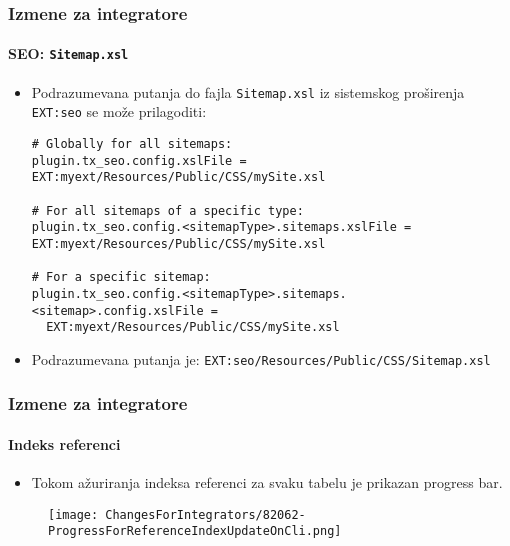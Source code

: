 \begin{frame}[fragile]
	\frametitle{Izmene za integratore}
	\framesubtitle{SEO: \texttt{Sitemap.xsl}}

	\lstset{basicstyle=\tiny\ttfamily}

	\begin{itemize}
		\item Podrazumevana putanja do fajla \texttt{Sitemap.xsl} iz sistemskog proširenja
			\texttt{EXT:seo} se može prilagoditi:

\vspace{-0.4cm}
\begin{lstlisting}
# Globally for all sitemaps:
plugin.tx_seo.config.xslFile = EXT:myext/Resources/Public/CSS/mySite.xsl

# For all sitemaps of a specific type:
plugin.tx_seo.config.<sitemapType>.sitemaps.xslFile = EXT:myext/Resources/Public/CSS/mySite.xsl

# For a specific sitemap:
plugin.tx_seo.config.<sitemapType>.sitemaps.<sitemap>.config.xslFile =
  EXT:myext/Resources/Public/CSS/mySite.xsl
\end{lstlisting}

		\item Podrazumevana putanja je:\newline
			\smaller
				\texttt{EXT:seo/Resources/Public/CSS/Sitemap.xsl}
			\normalsize

	\end{itemize}

\end{frame}


\begin{frame}[fragile]
	\frametitle{Izmene za integratore}
	\framesubtitle{Indeks referenci}

	\lstset{basicstyle=\tiny\ttfamily}

	\begin{itemize}
		\item Tokom ažuriranja indeksa referenci za svaku tabelu je prikazan progress bar.
	\end{itemize}

	\begin{figure}
		\texttt{[image: ChangesForIntegrators/82062-ProgressForReferenceIndexUpdateOnCli.png]}
	\end{figure}

\end{frame}

